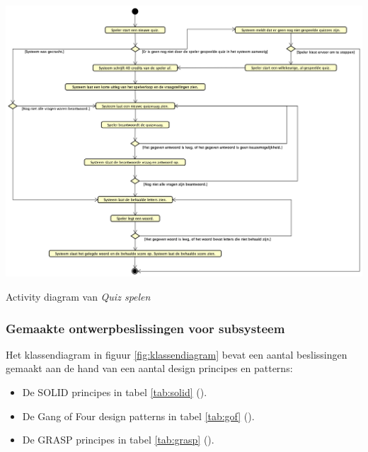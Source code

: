 \begin{mpfigure}
    \includegraphics[width=\linewidth]{../Afbeeldingen/Quiz spelen activity diagram.png}
    \caption{Activity diagram van \textit{Quiz spelen}}
    \label{fig:activitydiagramquizspelen}
\end{mpfigure}

\label{sec:designdesicions}\subsubsection{Gemaakte ontwerpbeslissingen voor subsysteem}
Het klassendiagram in figuur \ref{fig:klassendiagram} bevat een aantal beslissingen gemaakt aan de hand van een aantal design principes en patterns:

\begin{itemize}
    \item De SOLID principes in tabel \ref{tab:solid} (\cite{solid}).
    \item De Gang of Four design patterns in tabel \ref{tab:gof} (\cite[97]{designpatterns}).
    \item De GRASP principes in tabel \ref{tab:grasp} (\cite{larman}).
\end{itemize}

